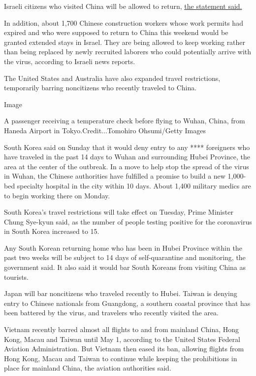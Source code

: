 Israeli citizens who visited China will be allowed to return,
\href{https://twitter.com/IsraeliPM/status/1223971839099187200}{the
statement said.}

In addition, about 1,700 Chinese construction workers whose work permits
had expired and who were supposed to return to China this weekend would
be granted extended stays in Israel. They are being allowed to keep
working rather than being replaced by newly recruited laborers who could
potentially arrive with the virus, according to Israeli news reports.

The United States and Australia have also expanded travel restrictions,
temporarily barring noncitizens who recently traveled to China.

Image

A passenger receiving a temperature check before flying to Wuhan, China,
from Haneda Airport in Tokyo.Credit...Tomohiro Ohsumi/Getty Images

South Korea said on Sunday that it would deny entry to any ****
foreigners who have traveled in the past 14 days to Wuhan and
surrounding Hubei Province, the area at the center of the outbreak. In a
move to help stop the spread of the virus in Wuhan, the Chinese
authorities have fulfilled a promise to build a new 1,000-bed specialty
hospital in the city within 10 days. About 1,400 military medics are to
begin working there on Monday.

South Korea's travel restrictions will take effect on Tuesday, Prime
Minister Chung Sye-kyun said, as the number of people testing positive
for the coronavirus in South Korea increased to 15.

Any South Korean returning home who has been in Hubei Province within
the past two weeks will be subject to 14 days of self-quarantine and
monitoring, the government said. It also said it would bar South Koreans
from visiting China as tourists.

Japan will bar noncitizens who traveled recently to Hubei. Taiwan is
denying entry to Chinese nationals from Guangdong, a southern coastal
province that has been battered by the virus, and travelers who recently
visited the area.

Vietnam recently barred almost all flights to and from mainland China,
Hong Kong, Macau and Taiwan until May 1, according to the United States
Federal Aviation Administration. But Vietnam then eased its ban,
allowing flights from Hong Kong, Macau and Taiwan to continue while
keeping the prohibitions in place for mainland China, the aviation
authorities said.

